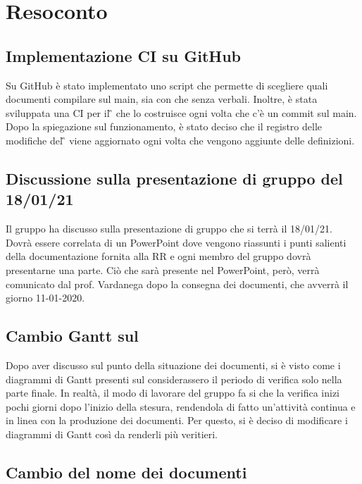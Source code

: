 \newpage


\section{Resoconto}

\subsection{Implementazione CI su GitHub}

Su GitHub è stato implementato uno script che permette di scegliere quali documenti compilare sul main, sia con che senza verbali. Inoltre, è stata sviluppata una CI per il \G{} che lo costruisce ogni volta che c'è un commit sul main. Dopo la spiegazione sul funzionamento, è stato deciso che il registro delle modifiche del \G{} viene aggiornato ogni volta che vengono aggiunte delle definizioni. 

\subsection{Discussione sulla presentazione di gruppo del 18/01/21}

Il gruppo ha discusso sulla presentazione di gruppo che si terrà il 18/01/21. Dovrà essere correlata di un PowerPoint dove vengono riassunti i punti salienti della documentazione fornita alla RR e ogni membro del gruppo dovrà presentarne una parte. Ciò che sarà presente nel PowerPoint, però, verrà comunicato dal prof. Vardanega dopo la consegna dei documenti, che avverrà il giorno 11-01-2020.

\subsection{Cambio Gantt sul \PdP{} }

Dopo aver discusso sul punto della situazione dei documenti, si è visto come i diagrammi di Gantt presenti sul \PdP{} considerassero il periodo di verifica solo nella parte finale. In realtà, il modo di lavorare del gruppo fa si che la verifica inizi pochi giorni dopo l'inizio della stesura, rendendola di fatto un'attività continua e in linea con la produzione dei documenti. Per questo, si è deciso di modificare i diagrammi di Gantt così da renderli più veritieri.

\subsection{Cambio del nome dei documenti}

